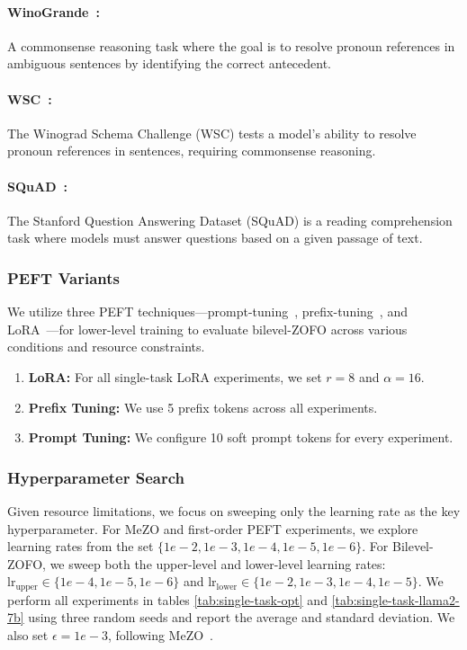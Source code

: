 \paragraph{WinoGrande~\citep{sakaguchi2021winogrande}:} A commonsense reasoning task where the goal is to resolve pronoun references in ambiguous sentences by identifying the correct antecedent.

\paragraph{WSC~\citep{levesque2012wsc}:} The Winograd Schema Challenge (WSC) tests a model's ability to resolve pronoun references in sentences, requiring commonsense reasoning.

\paragraph{SQuAD~\citep{rajpurkar2016squad}:} The Stanford Question Answering Dataset (SQuAD) is a reading comprehension task where models must answer questions based on a given passage of text.

\subsubsection{PEFT Variants} 
We utilize three PEFT techniques—prompt-tuning~\citep{LesterAC21PromptTuning}, prefix-tuning~\citep{LiL20PrefixTuning}, and LoRA~\citep{HuSWALWWC22LORA}—for lower-level training to evaluate bilevel-ZOFO across various conditions and resource constraints.

\begin{enumerate} 
\item \textbf{LoRA:} For all single-task LoRA experiments, we set $r=8$ and $\alpha=16$. 
\item \textbf{Prefix Tuning:} We use 5 prefix tokens across all experiments. 
\item \textbf{Prompt Tuning:} We configure 10 soft prompt tokens for every experiment. \end{enumerate}

\subsubsection{Hyperparameter Search}\label{app:single-hyperparameters}
Given resource limitations, we focus on sweeping only the learning rate as the key hyperparameter. For MeZO and first-order PEFT experiments, we explore learning rates from the set $\{1e-2, 1e-3, 1e-4, 1e-5, 1e-6\}$. For Bilevel-ZOFO, we sweep both the upper-level and lower-level learning rates: $\text{lr}_{\text{upper}} \in \{1e-4, 1e-5, 1e-6\}$ and $\text{lr}_{\text{lower}} \in \{1e-2, 1e-3, 1e-4, 1e-5\}$. We perform all experiments in tables \ref{tab:single-task-opt} and \ref{tab:single-task-llama2-7b} using three random seeds and report the average and standard deviation.  We also set $\epsilon=1e-3$, following MeZO~\cite{MalladiGNDL0A23Mezo}.

